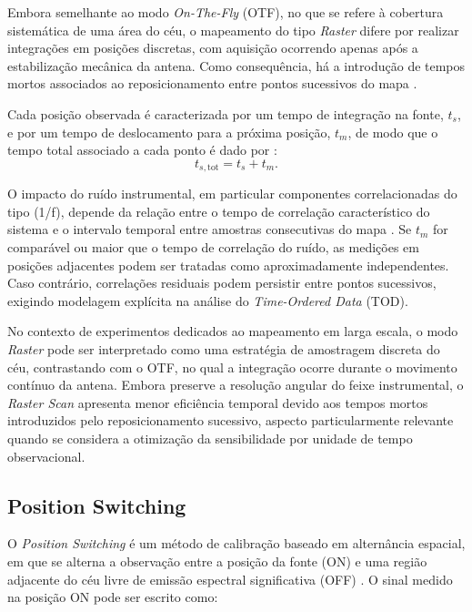 Embora semelhante ao modo \textit{On-The-Fly} (OTF), no que se refere à cobertura sistemática de uma área do céu, o mapeamento do tipo \textit{Raster} difere por realizar integrações em posições discretas, com aquisição ocorrendo apenas após a estabilização mecânica da antena. Como consequência, há a introdução de tempos mortos associados ao reposicionamento entre pontos sucessivos do mapa \cite{Ossenkopf2009_raster}.

Cada posição observada é caracterizada por um tempo de integração na fonte, $t_s$, e por um tempo de deslocamento para a próxima posição, $t_m$, de modo que o tempo total associado a cada ponto é dado por \cite{INAF_MappingTechniques_raster}:
\begin{equation}
t_{s,\mathrm{tot}} = t_s + t_m.
\end{equation}

O impacto do ruído instrumental, em particular componentes correlacionadas do tipo (1/f), depende da relação entre o tempo de correlação característico do sistema e o intervalo temporal entre amostras consecutivas do mapa \cite{INAF_MappingTechniques_raster}. Se $t_m$ for comparável ou maior que o tempo de correlação do ruído, as medições em posições adjacentes podem ser tratadas como aproximadamente independentes. Caso contrário, correlações residuais podem persistir entre pontos sucessivos, exigindo modelagem explícita na análise do \textit{Time-Ordered Data} (TOD).

No contexto de experimentos dedicados ao mapeamento em larga escala, o modo \textit{Raster} pode ser interpretado como uma estratégia de amostragem discreta do céu, contrastando com o OTF, no qual a integração ocorre durante o movimento contínuo da antena. Embora preserve a resolução angular do feixe instrumental, o \textit{Raster Scan} apresenta menor eficiência temporal devido aos tempos mortos introduzidos pelo reposicionamento sucessivo, aspecto particularmente relevante quando se considera a otimização da sensibilidade por unidade de tempo observacional.

\subsection{Position Switching}

O \textit{Position Switching} é um método de calibração baseado em alternância espacial, em que se alterna a observação entre a posição da fonte (ON) e uma região adjacente do céu livre de emissão espectral significativa (OFF) \cite{GBTog2011_green, wilson2013tools}. O sinal medido na posição ON pode ser escrito como:

